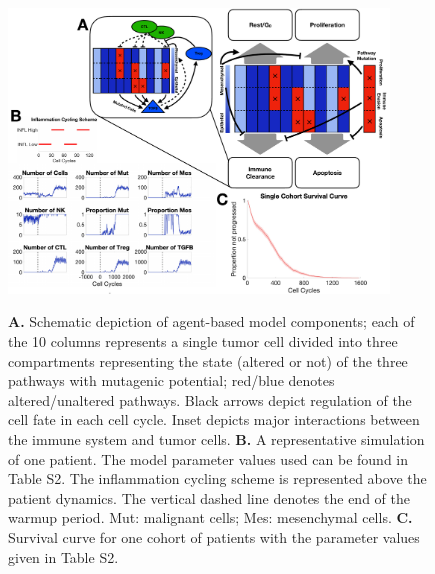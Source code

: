 \documentclass[11pt]{article}
\begin{document}
\begin{figure}
\center
{\includegraphics[width=0.9\textwidth]{Figure1/Figure1.pdf}}
\caption{{\bf A.} Schematic depiction of agent-based model components; each of the 10 columns represents a single tumor cell divided into three compartments representing the state (altered or not) of the three pathways with mutagenic potential; red/blue denotes altered/unaltered pathways. Black arrows depict regulation of the cell fate in each cell cycle. Inset depicts major interactions between the immune system and tumor cells.
{\bf B.} A representative simulation of one patient. The model parameter values used can be found in Table S2. 
The inflammation cycling scheme is represented above the patient dynamics. The vertical dashed line denotes the end of the warmup period. Mut: malignant cells; Mes: mesenchymal cells. 
{\bf C.} Survival curve for one cohort of patients with the parameter values given in Table S2.}
\label{fig:ModelIntro}
\end{figure}
\end{document}
